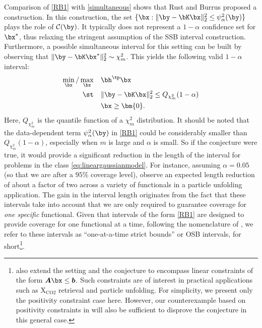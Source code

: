 \documentclass[11pt]{article}
\numberwithin{equation}{section}
\numberwithin{figure}{section}
\begin{document}
Comparison of \eqref{RB1} with \eqref{simultaneous} shows that Rust and Burrus proposed a  construction. 
In this construction, the set $\{\bx: \Vert \by - \bK \bx \Vert_2^2 \leq \psi^2_\alpha(\by)\}$ plays the role of $\mathcal{C}(\by)$. 
It typically does not represent a $1-\alpha$ confidence set for $\bx^*$, thus relaxing the stringent assumption of the SSB interval construction. Furthermore, a possible simultaneous interval for this setting can be built by observing that $\| \by-\bK\bx^* \|_2^2 \sim \chi^2_m$.
This yields the following valid $1-\alpha$ interval:
\begin{equation}
\begin{aligned}
\min_{\bx}/\max_{\bx} \quad & \bh^\tp\bx \\
\st \quad &\Vert \by - \bK\bx \Vert_2^2 \leq Q_{\chi^2_m}(1-\alpha)\\
  & \bx \geq \bm{0}.  \\
\end{aligned}
\end{equation}
Here, $Q_{\chi^2_m}$ is the quantile function of a $\chi^2_m$ distribution. 
It should be noted that the data-dependent term $\psi^2_\alpha(\by)$ in \eqref{RB1} could be considerably smaller than $Q_{\chi^2_m}(1-\alpha)$, especially when $m$ is large and $\alpha$ is small.
So if the \rustburrus conjecture were true, it would provide a significant reduction in the length of the interval for problems in the class \eqref{eq:lineargaussianmodel}.
For instance, assuming $\alpha = 0.05$ (so that we are after a $95$\% coverage level), \cite{stanley_unfolding} observe an expected length reduction of about a factor of two across a variety of functionals in a particle unfolding application.
The gain in the interval length originates from the fact that these intervals take into account that we are only required to guarantee coverage for \emph{one specific} functional. 
Given that intervals of the form \eqref{RB1} are designed to provide coverage for one functional at a time, following the nomenclature of \cite{stanley_unfolding}, we refer to these intervals as ``one-at-a-time strict bounds'' or OSB intervals, for short\footnote{\cite{patil,stanley_unfolding} also extend the setting and the conjecture to encompass linear constraints of the form $\boldsymbol{A}\bx \leq \boldsymbol{b}$. 
Such constraints are of interest in practical applications such as X$_{\mathrm{CO2}}$ retrieval and particle unfolding. 
For simplicity, we present only the positivity constraint case here. However, our counterexample based on positivity constraints in  will also be sufficient to disprove the conjecture in this general case.}.
\end{document}

